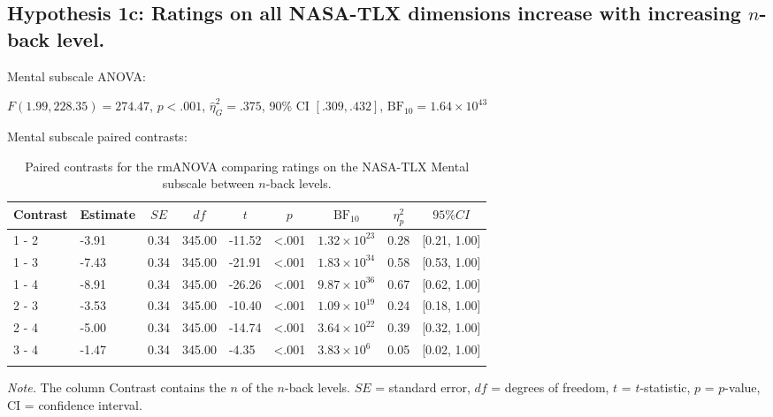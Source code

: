 \documentclass[
  man,floatsintext]{apa6}
\begin{document}
\newpage

\hypertarget{hypothesis-1c-ratings-on-all-nasa-tlx-dimensions-increase-with-increasing-n-back-level.}{%
\subsection{\texorpdfstring{Hypothesis 1c: Ratings on all NASA-TLX dimensions increase with increasing \(n\)-back level.}{Hypothesis 1c: Ratings on all NASA-TLX dimensions increase with increasing n-back level.}}\label{hypothesis-1c-ratings-on-all-nasa-tlx-dimensions-increase-with-increasing-n-back-level.}}

Mental subscale ANOVA:

\(F(1.99, 228.35) = 274.47\), \(p < .001\), \(\hat{\eta}^2_G = .375\), 90\% CI \([.309, .432]\), \(\mathrm{BF}_{\textrm{10}} = 1.64 \times 10^{43}\)

Mental subscale paired contrasts:

\begin{table}[H]

\begin{center}
\begin{threeparttable}

\caption{\label{tab:unnamed-chunk-3}Paired contrasts for the rmANOVA comparing ratings on the NASA-TLX Mental subscale between $n$-back levels.}

\begin{tabular}{lllllllll}
\toprule
Contrast & \multicolumn{1}{c}{Estimate} & \multicolumn{1}{c}{$SE$} & \multicolumn{1}{c}{$df$} & \multicolumn{1}{c}{$t$} & \multicolumn{1}{c}{$p$} & \multicolumn{1}{c}{$\mathrm{BF}_{\textrm{10}}$} & \multicolumn{1}{c}{$\eta_{p}^{2}$} & \multicolumn{1}{c}{$95\% CI$}\\
\midrule
1 - 2 & -3.91 & 0.34 & 345.00 & -11.52 & <.001 & $1.32 \times 10^{23}$ & 0.28 & {}[0.21, 1.00]\\
1 - 3 & -7.43 & 0.34 & 345.00 & -21.91 & <.001 & $1.83 \times 10^{34}$ & 0.58 & {}[0.53, 1.00]\\
1 - 4 & -8.91 & 0.34 & 345.00 & -26.26 & <.001 & $9.87 \times 10^{36}$ & 0.67 & {}[0.62, 1.00]\\
2 - 3 & -3.53 & 0.34 & 345.00 & -10.40 & <.001 & $1.09 \times 10^{19}$ & 0.24 & {}[0.18, 1.00]\\
2 - 4 & -5.00 & 0.34 & 345.00 & -14.74 & <.001 & $3.64 \times 10^{22}$ & 0.39 & {}[0.32, 1.00]\\
3 - 4 & -1.47 & 0.34 & 345.00 & -4.35 & <.001 & $3.83 \times 10^{6}$ & 0.05 & {}[0.02, 1.00]\\
\bottomrule
\addlinespace
\end{tabular}

\begin{tablenotes}[para]
\normalsize{\textit{Note.} The column Contrast contains the $n$ of the $n$-back levels. $SE$ = standard error, $df$ = degrees of freedom, $t$ = $t$-statistic, $p$ = $p$-value, CI = confidence interval.}
\end{tablenotes}

\end{threeparttable}
\end{center}

\end{table}
\end{document}
